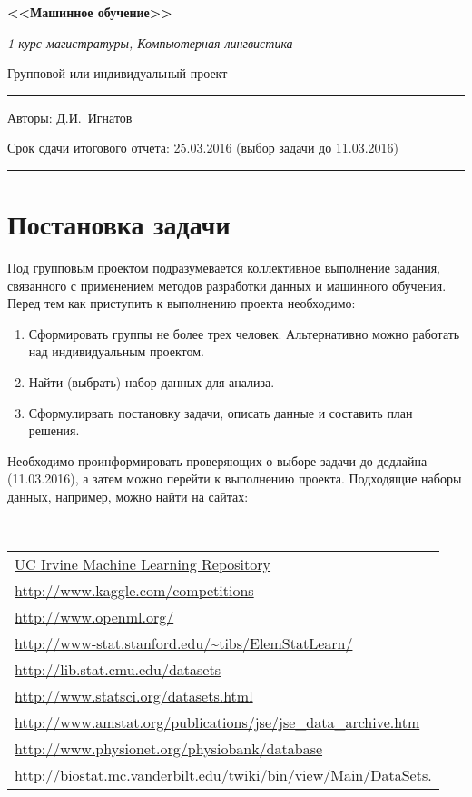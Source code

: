 \documentclass[12pt]{article}         %
\begin{document}
\begin{center}
\textbf{\large <<Машинное обучение>>}

\textit{1 курс магистратуры, Компьютерная лингвистика}

\end{center}
\begin{center}
{\large Групповой или индивидуальный проект}
\end{center}
\hrule
Авторы:  Д.И.~Игнатов


Срок сдачи итогового отчета: 25.03.2016 (выбор задачи до 11.03.2016)

\hrule


\section*{Постановка задачи}
Под групповым проектом подразумевается коллективное выполнение задания, связанного с применением методов разработки данных и машинного обучения. Перед тем как приступить к выполнению проекта необходимо:

\begin{enumerate}

  \item Сформировать группы не более трех человек. Альтернативно можно работать над индивидуальным проектом.
  \item Найти (выбрать) набор данных для анализа.
  \item Сформулирвать постановку задачи, описать данные и составить план решения.

\end{enumerate}
Необходимо проинформировать проверяющих о выборе задачи до дедлайна (11.03.2016), а затем можно перейти к выполнению проекта. Подходящие наборы данных, например, можно найти на сайтах:

 \


 \begin{tabular}{|l|}

   \hline
\href{http://archive.ics.uci.edu/ml/}{UC Irvine Machine Learning Repository}\\
\url{http://www.kaggle.com/competitions}{}\\
\url{http://www.openml.org/}{}\\
\url{http://www-stat.stanford.edu/~tibs/ElemStatLearn/}{}\\
\url{http://lib.stat.cmu.edu/datasets}{}\\
\url{http://www.statsci.org/datasets.html}{}\\
\url{http://www.amstat.org/publications/jse/jse_data_archive.htm}{}\\
\url{http://www.physionet.org/physiobank/database}{}\\
\url{http://biostat.mc.vanderbilt.edu/twiki/bin/view/Main/DataSets}{}.\\
   \hline

 \end{tabular}
\end{document}
